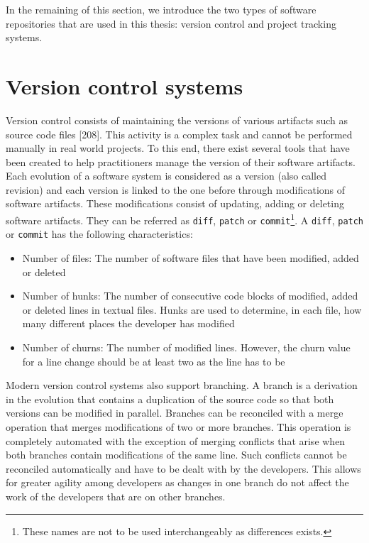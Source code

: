 \documentclass[12pt]{report}
\providecommand{\tightlist}{%
  \setlength{\itemsep}{0pt}\setlength{\parskip}{0pt}}
\begin{document}
In the remaining of this section, we introduce the two types of software
repositories that are used in this thesis: version control and project
tracking systems.

\section{\texorpdfstring{Version control
systems\label{sec:version-control}}{Version control systems}}\label{version-control-systems}

Version control consists of maintaining the versions of various
artifacts such as source code files {[}208{]}. This activity is a
complex task and cannot be performed manually in real world projects. To
this end, there exist several tools that have been created to help
practitioners manage the version of their software artifacts. Each
evolution of a software system is considered as a version (also called
revision) and each version is linked to the one before through
modifications of software artifacts. These modifications consist of
updating, adding or deleting software artifacts. They can be referred as
\lstinline!diff!, \lstinline!patch! or
\lstinline!commit!\footnote{These names are not to be used interchangeably as differences exists.}.
A \lstinline!diff!, \lstinline!patch! or \lstinline!commit! has the
following characteristics:

\begin{itemize}
\tightlist
\item
  Number of files: The number of software files that have been modified,
  added or deleted
\item
  Number of hunks: The number of consecutive code blocks of modified,
  added or deleted lines in textual files. Hunks are used to determine,
  in each file, how many different places the developer has modified
\item
  Number of churns: The number of modified lines. However, the churn
  value for a line change should be at least two as the line has to be
\end{itemize}

Modern version control systems also support branching. A branch is a
derivation in the evolution that contains a duplication of the source
code so that both versions can be modified in parallel. Branches can be
reconciled with a merge operation that merges modifications of two or
more branches. This operation is completely automated with the exception
of merging conflicts that arise when both branches contain modifications
of the same line. Such conflicts cannot be reconciled automatically and
have to be dealt with by the developers. This allows for greater agility
among developers as changes in one branch do not affect the work of the
developers that are on other branches.
\end{document}
